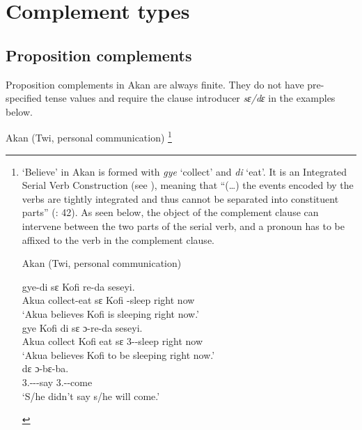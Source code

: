 \documentclass[output=paper]{langscibook}
\begin{document}
\section{Complement types}\label{Pajsect:3}

\subsection{Proposition complements}\label{Pajsect3.1}

Proposition complements in Akan are always finite. They do not have pre-specified tense values and require the clause introducer \emph{sɛ/dɛ} in the examples below.\newpage

\begin{exe}
\ex \label{Paj11} Akan (Twi, personal communication) \footnote{
‘Believe’ in Akan is formed with \emph{gye} ‘collect’ and \emph{di} ‘eat’. It is an Integrated Serial Verb Construction (see \citealt{osam2003}), meaning that “(…) the events encoded by the verbs are tightly integrated and thus cannot be separated into constituent parts” (\citealt{owusu2014}: 42). As seen below, the object of the complement clause can intervene between the two parts of the serial verb, and a pronoun has to be affixed to the verb in the complement clause. 

\begin{exe}
\ex \label{Paj1footnote} Akan (Twi, personal communication)
\begin{xlist}

\ex \label{Paj1footnotea}
 {gye-di} {s{ɛ}} {Kofi} {re-da} {seseyi.} \\
     Akua collect-eat s{ɛ} Kofi -sleep {right now}\\
\glt `Akua believes Kofi is sleeping right now.'\\

\ex \label{Paj1footnoteb}
 {gye} {Kofi} {di} {s{ɛ}} {{ɔ}-re-da} {seseyi.} \\
     Akua collect Kofi eat s{ɛ} 3{\sg}--sleep {right now}\\
\glt `Akua believes Kofi to be sleeping right now.'\\

\ex \label{Paj1footnotec}
 {d{ɛ}} {{ɔ}-b{ɛ}-ba.} \\
     3{\sg}.{\subj}-{\compl}--say {\comp} 3{\sg}.{\subj}--come\\
\glt `S/he didn't say s/he will come.'\\


\end{xlist}
\end{exe}}
\end{exe}
\end{document}
